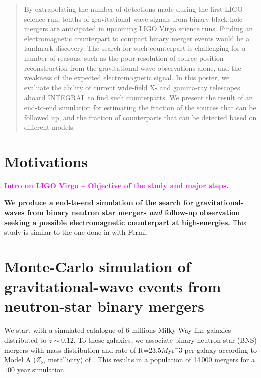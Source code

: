 \documentclass[a0,portrait]{a0poster}
\renewcommand{\emph}[1]{\textbf{\color{blue}#1}}
\newcommand{\ECM}[1] {\textbf{\textcolor{magenta}{#1}}}
\begin{document}
\begin{multicols}{2} %


 \begin{abstract}
   By extrapolating the number of detections made during the first LIGO science
   run, tenths of gravitational wave signals from binary black hole mergers are
   anticipated in upcoming LIGO Virgo science runs. Finding an electromagnetic
   counterpart to compact binary merger events would be a landmark
   discovery. The search for such counterpart is challenging for a number of
   reasons, such as the poor resolution of source position reconstruction from
   the gravitational wave observations alone, and the weakness of the expected
   electromagnetic signal. In this poster, we evaluate the ability of current
   wide-field X- and gamma-ray telescopes aboard INTEGRAL to find such
   counterparts. We present the result of an end-to-end simulation for
   estimating the fraction of the sources that can be followed up, and the
   fraction of counterparts that can be detected based on different models.
 \end{abstract}


\section*{Motivations}

\ECM{Intro on LIGO Virgo -- Objective of the study and major steps.}

\emph{We produce a end-to-end simulation of the search for gravitational-waves
from binary neutron star mergers \textit{and} follow-up observation seeking a
 possible electromagnetic counterpart at high-energies.} This study is similar
to the one done in \cite{2016arXiv160606124P} with Fermi.

\section*{Monte-Carlo simulation of gravitational-wave events from neutron-star binary mergers}

We start with a simulated catalogue of 6 millions Milky Way-like galaxies
distributed to $z\sim 0.12$. To those galaxies, we associate binary neutron star
(BNS) mergers with mass distribution and rate of R=$23.5 M\mathrm{yr}^-3$ per galaxy
according to Model A ($Z_{\astrosun}$ metallicity) of
\cite{dominik12:_doubl_compac_objec}. This results in a population of 14\,000
mergers for a $100$ year simulation.


\end{multicols}
\end{document}
